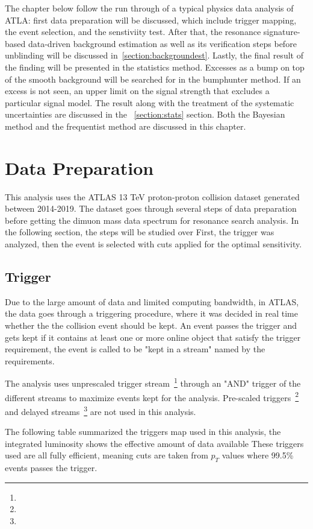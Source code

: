 The chapter below follow the run through of a typical physics data analysis of ATLA: first data preparation will be discussed, which include trigger mapping, the event selection, and the senstiviity test. After that, the resonance signature-based data-driven background estimation as well as its verification steps before unblinding will be discussed in~\ref{section:backgroundest}. Lastly, the final result of the finding will be presented in the statistics method. Excesses as a bump on top of the
smooth background will be searched for in the bumphunter method. If an excess is not seen, an upper limit on the signal strength that excludes a particular signal model. The result along with the treatment of the systematic uncertainties are discussed in the ~\ref{section:stats} section. Both the Bayesian method and the frequentist method are discussed in this chapter. 

\section{Data Preparation}
\label{section:dataprep}
This analysis uses the ATLAS 13 TeV proton-proton collision dataset generated between 2014-2019. The dataset goes through several steps of data preparation before getting the dimuon mass data spectrum for resonance search analysis. 
In the following section, the steps will be studied over
First, the trigger was analyzed, then the event is selected with cuts applied for the optimal sensitivity. 

\subsection{Trigger}
Due to the large amount of data and limited computing bandwidth, in ATLAS, the data goes through a triggering procedure, where it was decided in real time whether the the collision event should be kept. An event passes the trigger and gets kept if it contains at least one or more online object that satisfy the trigger requirement, the event is called to be "kept in a stream" named by the requirements.

The analysis uses unprescaled trigger stream~\footnote{} through an "AND" trigger of the different streams to maximize events kept for the analysis. Pre-scaled triggers~\footnote{} and delayed streams~\footnote{} are not used in this analysis. 

The following table summarized the triggers map used in this analysis, the integrated luminosity shows the effective amount of data available
These triggers used are all fully efficient, meaning cuts are taken from $p_{T}$ values where 99.5\% events passes the trigger.

